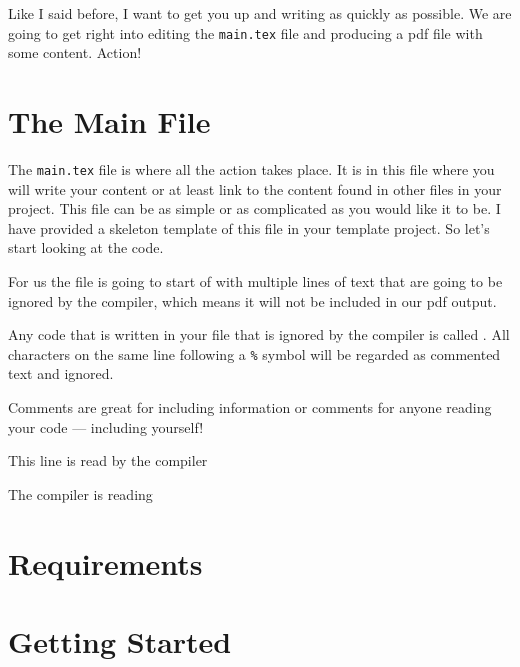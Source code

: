 Like I said before, I want to get you up and writing as quickly as possible.
We are going to get right into editing the \texttt{main.tex} file and producing
a pdf file with some content.  Action!

\section{The Main File}
The \texttt{main.tex} file is where all the action takes place.  It is in this
file where you will write your content or at least link to the content found in
other files in your project.  This file can be as simple or as complicated as 
you would like it to be.  I have provided a skeleton template of this file in
your template project.  So let's start looking at the code.

For us the file is going to start of with multiple lines of text that are going
to be ignored by the compiler, which means it will not be included in our pdf
output.
\begin{definition}
  Any code that is written in your file that is ignored by the compiler is
  called .  All characters on the same line following
  a \verb!%! symbol will be regarded as commented text and ignored.
\end{definition}

Comments are great for including information or comments for anyone reading
your code --- including yourself!
\begin{mhotexbox}
This line is read by the compiler

The compiler is reading %
\end{mhotexbox}

\section{Requirements}

\section{Getting Started}

